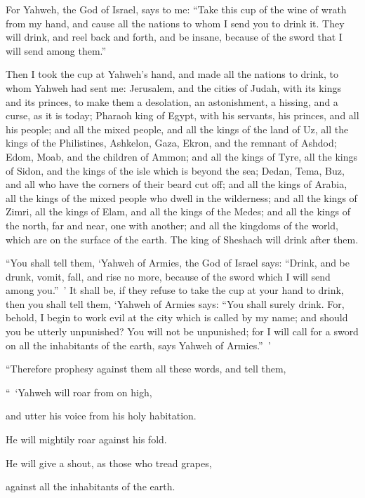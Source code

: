 {\par }{\PP {}For Yahweh, the God of Israel, says to me: “Take this cup of the wine of wrath from my hand, and cause all the nations to whom I send you to drink it.
They will drink, and reel back and forth, and be insane, because of the sword that I will send among them.”
\par }{\PP {}Then I took the cup at Yahweh’s hand, and made all the nations to drink, to whom Yahweh had sent me:
Jerusalem, and the cities of Judah, with its kings and its princes, to make them a desolation, an astonishment, a hissing, and a curse, as it is today;
Pharaoh king of Egypt, with his servants, his princes, and all his people;
and all the mixed people, and all the kings of the land of Uz, all the kings of the Philistines, Ashkelon, Gaza, Ekron, and the remnant of Ashdod;
Edom, Moab, and the children of Ammon;
and all the kings of Tyre, all the kings of Sidon, and the kings of the isle which is beyond the sea;
Dedan, Tema, Buz, and all who have the corners of their beard cut off;
and all the kings of Arabia, all the kings of the mixed people who dwell in the wilderness;
and all the kings of Zimri, all the kings of Elam, and all the kings of the Medes;
and all the kings of the north, far and near, one with another; and all the kingdoms of the world, which are on the surface of the earth. The king of Sheshach will drink after them.
\par }{\PP {}“You shall tell them, ‘Yahweh of Armies, the God of Israel says: “Drink, and be drunk, vomit, fall, and rise no more, because of the sword which I will send among you.” ’
It shall be, if they refuse to take the cup at your hand to drink, then you shall tell them, ‘Yahweh of Armies says: “You shall surely drink.
For, behold, I begin to work evil at the city which is called by my name; and should you be utterly unpunished? You will not be unpunished; for I will call for a sword on all the inhabitants of the earth, says Yahweh of Armies.” ’
\par }{\PP {}“Therefore prophesy against them all these words, and tell them,
\par }{\Q “ ‘Yahweh will roar from on high,
\par }{\QB and utter his voice from his holy habitation.
\par }{\QB He will mightily roar against his fold.
\par }{\Q He will give a shout, as those who tread grapes,
\par }{\QB against all the inhabitants of the earth.
}
